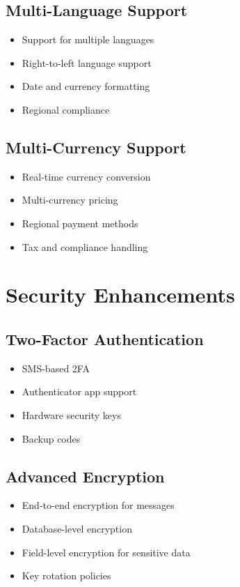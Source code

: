 \subsection{Multi-Language Support}

\begin{itemize}
    \item Support for multiple languages
    \item Right-to-left language support
    \item Date and currency formatting
    \item Regional compliance
\end{itemize}

\subsection{Multi-Currency Support}

\begin{itemize}
    \item Real-time currency conversion
    \item Multi-currency pricing
    \item Regional payment methods
    \item Tax and compliance handling
\end{itemize}

\section{Security Enhancements}

\subsection{Two-Factor Authentication}

\begin{itemize}
    \item SMS-based 2FA
    \item Authenticator app support
    \item Hardware security keys
    \item Backup codes
\end{itemize}

\subsection{Advanced Encryption}

\begin{itemize}
    \item End-to-end encryption for messages
    \item Database-level encryption
    \item Field-level encryption for sensitive data
    \item Key rotation policies
\end{itemize}


